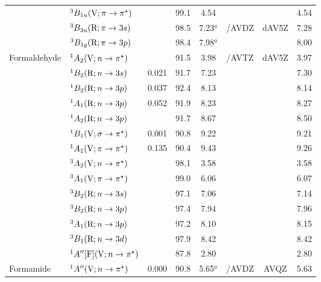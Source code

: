 \begin{tabular}{llcccccc}
                        &$^3B_{1u} (\mathrm{V};\pi \rightarrow \pi^\star)$ 				&		&99.1 &4.54		& 			&			&4.54	\\
                        &$^3B_{3u} (\mathrm{R};\pi \rightarrow 3s)$ 					&		&98.5 &7.23$^a$	&{\exCI}/AVDZ& dAV5Z		&7.28	\\
                        &$^3B_{1g} (\mathrm{R};\pi \rightarrow 3p)$ 					&		&98.4 &7.98$^a$	&			&			&8.00	\\
      Formaldehyde	&$^1A_2 (\mathrm{V}; n \rightarrow \pi^\star)$ 				&		&91.5 &3.98		&{\exCI}/AVTZ & dAV5Z		&3.97	\\
                        &$^1B_2 (\mathrm{R};n \rightarrow 3s)$ 						& 0.021	&91.7 &7.23		&			 &			&7.30	\\
                        &$^1B_2 (\mathrm{R};n \rightarrow 3p)$ 						& 0.037	&92.4 &8.13		&			&			&8.14	\\
                        &$^1A_1 (\mathrm{R};n \rightarrow 3p)$ 						& 0.052	&91.9 &8.23		&			&			&8.27	\\
                        &$^1A_2 (\mathrm{R};n \rightarrow 3p)$ 						&		&91.7 &8.67		&			&			&8.50	\\
                        &$^1B_1 (\mathrm{V};\sigma \rightarrow \pi^\star)$				& 0.001	&90.8 &9.22		&			&			&9.21	\\
                        &$^1A_1 (\mathrm{V};\pi \rightarrow \pi^\star)$				& 0.135	&90.4 &9.43		&			&			&9.26	\\
                        &$^3A_2 (\mathrm{V};n \rightarrow \pi^\star)$ 					&		&98.1 &3.58		&			&			&3.58	\\
                        &$^3A_1 (\mathrm{V};\pi \rightarrow \pi^\star)$				&		&99.0 &6.06		&			&			&6.07	\\
                        &$^3B_2 (\mathrm{R};n \rightarrow 3s)$ 						&		&97.1 &7.06		&			&			&7.14	\\
                        &$^3B_2 (\mathrm{R};n \rightarrow 3p)$ 						&		&97.4 &7.94		&			&			&7.96	\\
                        &$^3A_1 (\mathrm{R};n \rightarrow 3p)$ 						&		&97.2 &8.10		&			&			&8.15	\\
                        &$^3B_1 (\mathrm{R};n \rightarrow 3d)$ 						&		&97.9 &8.42		&			&			&8.42	\\
                        &$^1A^{\prime\prime} [\mathrm{F}] (\mathrm{V};n \rightarrow \pi^\star)$			&		&87.8 &2.80		&			&			&2.80	\\
      Formamide	&$^1A^{\prime\prime} (\mathrm{V};n \rightarrow \pi^\star)$					&0.000	&90.8 &5.65$^a$	&{\exCI}/AVDZ& AVQZ		&5.63	\\

\end{tabular}
